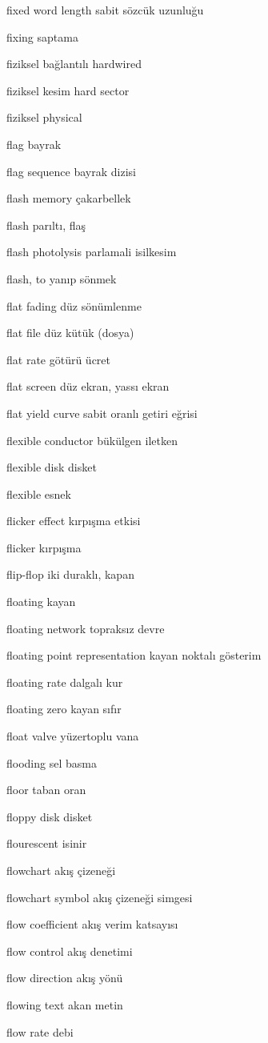\documentclass[12pt,fleqn]{article}\usepackage{../../common}
\begin{document}
fixed word length sabit sözcük uzunluğu

fixing saptama

fiziksel bağlantılı hardwired

fiziksel kesim hard sector

fiziksel physical

flag bayrak

flag sequence bayrak dizisi

flash memory çakarbellek

flash parıltı, flaş

flash photolysis parlamali isilkesim

flash, to yanıp sönmek

flat fading düz sönümlenme

flat file düz kütük (dosya)

flat rate götürü ücret

flat screen düz ekran, yassı ekran

flat yield curve sabit oranlı getiri eğrisi

flexible conductor bükülgen iletken

flexible disk disket

flexible esnek

flicker effect kırpışma etkisi

flicker kırpışma

flip-flop iki duraklı, kapan

floating kayan

floating network topraksız devre

floating point representation kayan noktalı gösterim

floating rate dalgalı kur

floating zero kayan sıfır

float valve yüzertoplu vana

flooding sel basma

floor taban oran

floppy disk disket

flourescent isinir

flowchart akış çizeneği

flowchart symbol akış çizeneği simgesi

flow coefficient akış verim katsayısı

flow control akış denetimi

flow direction akış yönü

flowing text akan metin

flow rate debi
\end{document}
